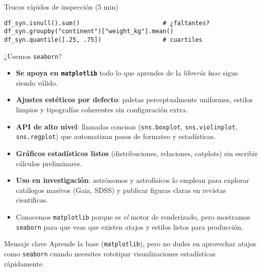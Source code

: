 \documentclass[10pt]{beamer}
\begin{document}
\begin{frame}[fragile]{Trucos rápidos de inspección (5 min)}
\begin{verbatim}
df_syn.isnull().sum()                       # ¿faltantes?
df_syn.groupby("continent")["weight_kg"].mean()
df_syn.quantile([.25, .75])                 # cuartiles
\end{verbatim}
\end{frame}

\begin{frame}[fragile]{¿Usemos \texttt{seaborn}?}
\begin{itemize} \footnotesize
  \item \textbf{Se apoya en \texttt{matplotlib}} todo lo que aprendes de la \textit{librería base} sigue siendo válido.
  \item \textbf{Ajustes estéticos por defecto}: paletas perceptualmente uniformes, estilos limpios y tipografías coherentes sin configuración extra.
  \item \textbf{API de alto nivel}: llamadas concisas (\texttt{sns.boxplot}, \texttt{sns.violinplot}, \texttt{sns.regplot}) que automatizan pasos de formateo y estadísticas.
  \item \textbf{Gráficos estadísticos listos} (distribuciones, relaciones, catplots) sin escribir cálculos preliminares.
  \item \textbf{Uso en investigación}: astrónomos y astrofísicos lo emplean para explorar catálogos masivos (Gaia, SDSS) y publicar figuras claras en revistas científicas.
  \item Conocemos \texttt{matplotlib} porque es \emph{el} motor de renderizado, pero mostramos \texttt{seaborn} para que veas que existen atajos y estilos listos para producción.
\end{itemize}

\small{
\begin{block}{Mensaje clave}
Aprende la base (\texttt{matplotlib}), pero no dudes en aprovechar atajos como \texttt{seaborn} cuando necesites  rototipar visualizaciones estadísticas rápidamente.
\end{block}
}

\end{frame}
\end{document}
